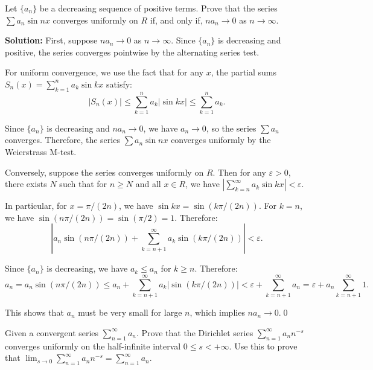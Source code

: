 \begin{problembox}
Let \(\{a_n\}\) be a decreasing sequence of positive terms. Prove that the series \(\sum a_n \sin nx \) converges uniformly on \( R \) if, and only if, \( na_n \to 0 \) as \( n \to \infty \).
\end{problembox}

\bigskip\noindent\textbf{Solution:} First, suppose \( na_n \to 0 \) as \( n \to \infty \). Since \( \{a_n\} \) is decreasing and positive, the series converges pointwise by the alternating series test.

For uniform convergence, we use the fact that for any \( x \), the partial sums \( S_n(x) = \sum_{k=1}^n a_k \sin kx \) satisfy:
\[|S_n(x)| \leq \sum_{k=1}^n a_k |\sin kx| \leq \sum_{k=1}^n a_k.\]

Since \( \{a_n\} \) is decreasing and \( na_n \to 0 \), we have \( a_n \to 0 \), so the series \( \sum a_n \) converges. Therefore, the series \( \sum a_n \sin nx \) converges uniformly by the Weierstrass M-test.

Conversely, suppose the series converges uniformly on \( R \). Then for any \( \varepsilon > 0 \), there exists \( N \) such that for \( n \geq N \) and all \( x \in R \), we have \( |\sum_{k=n}^{\infty} a_k \sin kx| < \varepsilon \).

In particular, for \( x = \pi/(2n) \), we have \( \sin kx = \sin(k\pi/(2n)) \). For \( k = n \), we have \( \sin(n\pi/(2n)) = \sin(\pi/2) = 1 \). Therefore:
\[|a_n \sin(n\pi/(2n)) + \sum_{k=n+1}^{\infty} a_k \sin(k\pi/(2n))| < \varepsilon.\]

Since \( \{a_n\} \) is decreasing, we have \( a_k \leq a_n \) for \( k \geq n \). Therefore:
\[a_n = a_n \sin(n\pi/(2n)) \leq a_n + \sum_{k=n+1}^{\infty} a_k |\sin(k\pi/(2n))| < \varepsilon + \sum_{k=n+1}^{\infty} a_n = \varepsilon + a_n \sum_{k=n+1}^{\infty} 1.\]

This shows that \( a_n \) must be very small for large \( n \), which implies \( na_n \to 0 \).\qed


\begin{problembox}
Given a convergent series \(\sum_{n=1}^{\infty} a_n \). Prove that the Dirichlet series \(\sum_{n=1}^{\infty} a_n n^{-s}\) converges uniformly on the half-infinite interval \( 0 \leq s < +\infty \). Use this to prove that \(\lim_{s \to 0} \sum_{n=1}^{\infty} a_n n^{-s} = \sum_{n=1}^{\infty} a_n\).
\end{problembox}

